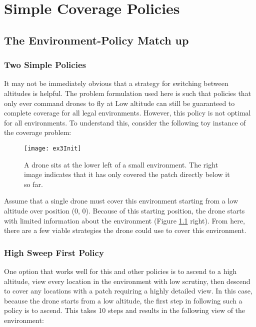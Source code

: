 \chapter{Simple Coverage Policies}

\section{The Environment-Policy Match up}

\subsection{Two Simple Policies}

It may not be immediately obvious that a strategy for switching between altitudes is helpful. The problem formulation used here is such that policies that only ever command drones to fly at Low altitude can still be guaranteed to complete coverage for all legal environments. However, this policy is not optimal for all environments. To understand this, consider the following toy instance of the coverage problem:

\begin{figure}[H]
\texttt{[image: ex3Init]}
\caption[Tiny Square Environment]{A drone sits at the lower left of a small environment. The right image indicates that it has only covered the patch directly below it so far.}
\label{fig:ex3-1-start}
\end{figure}

Assume that a single drone must cover this environment starting from a low altitude over position (0, 0). Because of this starting position, the drone starts with limited information about the environment (Figure \ref{fig:ex3-1-start} right). From here, there are a few viable strategies the drone could use to cover this environment.

\subsection{High Sweep First Policy}

One option that works well for this and other policies is to ascend to a high altitude, view every location in the environment with low scrutiny, then descend to cover any locations with a patch requiring a highly detailed view. In this case, because the drone starts from a low altitude, the first step in following such a policy is to ascend. This takes 10 steps and results in the following view of the environment:

